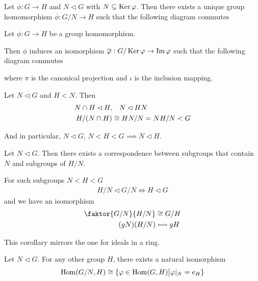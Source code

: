 \begin{prop}
  Let $\phi: G \to H$ and $N \lhd  G$ with $N \subseteq \operatorname{Ker} \varphi$. Then there exists a unique group homomorphism
  $\overline{\phi}: G/N \to H$ such that the following diagram commutes
  \begin{center}
  \end{center}
\end{prop}


\begin{thm}
  Let $\phi: G \to H$ be a group homomorphism.

  Then $\phi$ induces an isomorphism $\overline{\varphi}: G/\operatorname{Ker} \varphi \to \operatorname{Im} \varphi$ such that the following diagram commutes
  \begin{center}
  \end{center}
  where $\pi$ is the canonical projection and $\iota$ is the inclusion mapping.
\end{thm}

\begin{cor}
  Let $N \lhd G$ and $H < N$. Then
  \begin{align*}
    N \cap H \lhd H, &\quad N \lhd HN\\
    H/(N \cap H) &\cong HN/N = NH/N < G
  \end{align*}
\end{cor}
And in particular, $N \lhd G$, $N < H < G \implies N \lhd H$.

\begin{cor}
  Let $N \lhd G$. 
  Then there exists a correspondence between subgroups that contain $N$ and subgroups of $H/N$.

  For such subgroups $N < H < G$
  \begin{align*}
    H/N \lhd G/N \iff H \lhd G
  \end{align*}
  and we have an isomorphism
  \begin{align*}
    \faktor{G/N}{H/N} &\iso G/H\\
    (gN)(H/N) &\leftrightsquigarrow gH
  \end{align*}
\end{cor}
This corollary mirrors the one for ideals in a ring.



\begin{cor}[]
Let $N \lhd G$. For any other group $H$, there exists a natural isomorphism
\begin{align*}
  \operatorname{Hom}(G/N,H) \cong \{\varphi \in \operatorname{Hom}(G,H) \big\vert \varphi|_N = e_H\}
\end{align*}
\end{cor}
 
